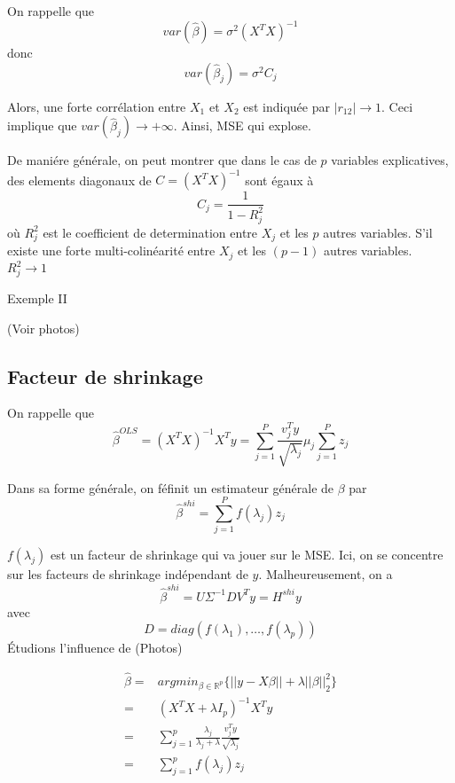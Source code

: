 \documentclass{article}
\begin{document}
On rappelle que
\begin{equation}
var(\hat{\beta})=\sigma^2(X^TX)^{-1}
\end{equation}
donc
\begin{equation}
var(\hat{\beta}_j)=\sigma^2C_j
\end{equation}

Alors, une forte corr\'elation entre $X_1$ et $X_2$ est indiqu\'ee par $|r_{12}|\to 1$. Ceci implique que $var(\hat{\beta}_j)\to +\infty$.
Ainsi, MSE qui explose.

De mani\'ere g\'en\'erale, on peut montrer que dans le cas de $p$ variables explicatives, des elements diagonaux de $C=(X^TX)^{-1}$ sont \'egaux \`a 
\begin{equation}
C_j=\frac{1}{1-R_j^2}
\end{equation}
o\`u $R_j^2$ est le coefficient de determination entre $X_j$ et les $p$ autres variables. S'il existe une forte multi-colin\'earit\'e entre $X_j$ et les  $(p-1)$ autres variables. $R_j^2\to 1$

Exemple II

(Voir photos)

\subsection{Facteur de shrinkage}
On rappelle que 
\begin{equation}
\hat{\beta}^{OLS}=(X^TX)^{-1}X^Ty=\sum_{j=1}^{P}\frac{v_j^Ty}{\sqrt{\lambda_j}}\mu_j\sum_{j=1}^{P}z_j
\end{equation}

Dans sa forme g\'en\'erale, on f\'efinit un estimateur g\'en\'erale de $\beta$ par
\begin{equation}
\hat{\beta}^{shi}=\sum_{j=1}^{P}f(\lambda_j)z_j
\end{equation}

$f(\lambda_j)$ est un facteur de shrinkage qui va jouer sur le MSE. Ici, on se concentre sur les facteurs de shrinkage ind\'ependant de $y$. Malheureusement, on a 
\begin{equation}
\hat{\beta}^{shi}=U\Sigma^{-1}DV^Ty=H^{shi}y
\end{equation}
avec
\begin{equation}
D=diag(f(\lambda_1),\ldots,f(\lambda_p))
\end{equation}
\'Etudions l'influence de 
(Photos)

\begin{equation}
\begin{split}
\hat{\beta}=&argmin_{\beta\in\mathbb{R}^p}\{||y-X\beta||+\lambda||\beta||_2^2\}\\
=&(X^TX+\lambda I_p)^{-1}X^Ty\\
=&\sum_{j=1}^p\frac{\lambda_j}{\lambda_j+\lambda}\frac{v^T_jy}{\sqrt{\lambda_j}}\\
=&\sum_{j=1}^p f(\lambda_j)z_j
\end{split}
\end{equation}
\end{document}
